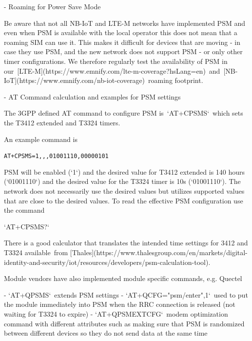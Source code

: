 \documentclass[11pt, oneside]{article}   	%
\newcommand{\addspace}{\vspace{2mm}}
\begin{document}
\addspace
\begin{markdown}
- Roaming for Power Save Mode 
\end{markdown}
\addspace
\begin{markdown}

Be aware that not all NB-IoT and LTE-M networks have implemented PSM and even when PSM is available with the local operator this does not mean that a roaming SIM can use it.
This makes it difficult for devices that are moving - in case they use PSM, and the new network does not support PSM - or only other timer configurations.
We therefore regularly test the availability of PSM in our [LTE-M](https://www.emnify.com/lte-m-coverage?hsLang=en) and [NB-IoT](https://www.emnify.com/nb-iot-coverage) roaming footprint.

\end{markdown}
\addspace
\begin{markdown}
- AT Command calculation and examples for PSM settings 
\end{markdown}
\addspace
\begin{markdown} 

The 3GPP defined AT command to configure PSM is `AT+CPSMS` which sets the T3412 extended and T3324 timers. 

An example command is 

\end{markdown}

\texttt{AT+CPSMS=1,}\texttt{,}\texttt{,01001110,00000101}

\begin{markdown}

PSM will be enabled (`1`) and the desired value for T3412 extended is 140 hours (`01001110`) and the desired value for the T3324 timer is 10s (`01001110`).
The network does not necessarily use the desired values but utilizes supported values that are close to the desired values.
To read the effective PSM configuration use the command  

`AT+CPSMS?`

There is a good calculator that translates the intended time settings for 3412 and T3324 available from [Thales](https://www.thalesgroup.com/en/markets/digital-identity-and-security/iot/resources/developers/psm-calculation-tool). 

Module vendors have also implemented module specific commands, e.g. Quectel

\end{markdown}
\addspace
\begin{markdown}
- `AT+QPSMS` extends PSM settings
- `AT+QCFG="psm/enter",1` used to put the module immediately into PSM when the RRC connection is released (not waiting for T3324 to expire)
- `AT+QPSMEXTCFG` modem optimization command with different attributes such as making sure that PSM is randomized between different devices so they do not send data at the same time
\end{markdown}
\end{document}
